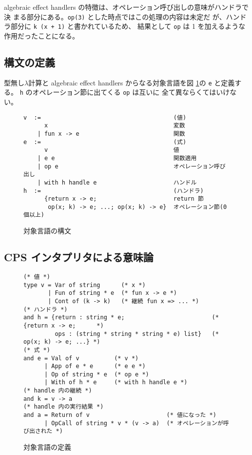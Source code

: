 algebraic effect handlers の特徴は、オペレーション呼び出しの意味がハンドラで決
まる部分にある。\texttt{op(3)} とした時点ではこの処理の内容は未定だ
が、ハンドラ部分に \texttt{k (x + 1)} と書かれているため、
結果として \texttt{op} は 1 を加えるような作用だったことになる。

\subsection{構文の定義}
\label{subsection:syntax}
型無し$\lambda$計算と algebraic effect handlers からなる対象言語を図 \ref{figure:abstract_syntax}の \texttt{e} と定義する。
\texttt{h} のオペレーション節に出てくる \texttt{op} は互いに
全て異ならくてはいけない。

\begin{figure}[t]
\begin{verbatim}
v  :=                                      (値)
      x                                    変数
    | fun x -> e                           関数
e  :=                                      (式)
      v                                    値
    | e e                                  関数適用
    | op e                                 オペレーション呼び出し
    | with h handle e                      ハンドル
h  :=                                      (ハンドラ)
      {return x -> e;                      return 節
       op(x; k) -> e; ...; op(x; k) -> e}  オペレーション節(0個以上)
\end{verbatim}
\caption{対象言語の構文}
\label{figure:abstract_syntax}
\end{figure}

\subsection{CPS インタプリタによる意味論}
\label{subsection:1cps}

\begin{figure}[t]
\begin{spacing}{0.9}
\begin{verbatim}
(* 値 *)
type v = Var of string      (* x *)
       | Fun of string * e  (* fun x -> e *)
       | Cont of (k -> k)   (* 継続 fun x => ... *)
(* ハンドラ *)
and h = {return : string * e;                         (* {return x -> e;      *)
         ops : (string * string * string * e) list}   (*  op(x; k) -> e; ...} *)
(* 式 *)
and e = Val of v          (* v *)
      | App of e * e      (* e e *)
      | Op of string * e  (* op e *)
      | With of h * e     (* with h handle e *)
(* handle 内の継続 *)
and k = v -> a
(* handle 内の実行結果 *)
and a = Return of v                      (* 値になった *)
      | OpCall of string * v * (v -> a)  (* オペレーションが呼び出された *)
\end{verbatim}
\caption{対象言語の定義}
\label{figure:syntax}
\end{spacing}
\end{figure}

